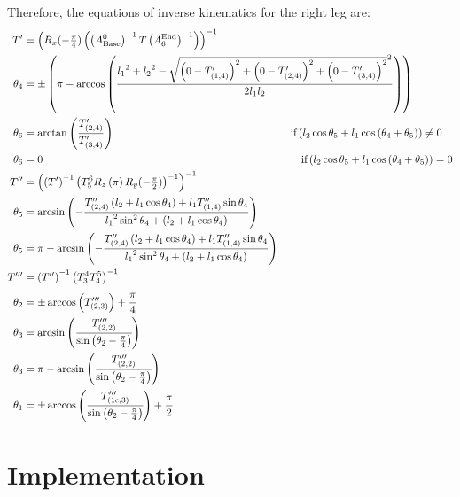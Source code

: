 Therefore, the equations of inverse kinematics for the right leg are:
\begin{align*}%
T' &= \left(R_x(-\tfrac{\pi}{4})\left(\left(A^0_\text{Base}\right)^{-1} T \left(A^\text{End}_6\right)^{-1}\right)\right)^{-1} \\
\theta_4 &=\pm\left(\pi - \arccos\left(\frac{{l_1}^2 + {l_2}^2 - \sqrt{\left(0-T'_{(1,4)}\right)^2 + \left(0-T'_{(2,4)}\right)^2 + \left(0-T'_{(3,4)}\right)^2}^2}{2 l_1 l_2}\right)\right) \\
\theta_6 &= \arctan\left(\frac{T'_{(2,4)}}{T'_{(3,4)}}\right)\hspace{5.78cm}\text{if} \left(l_2\cos\theta_5 + l_1 \cos\left(\theta_4 + \theta_5\right)\right) \neq 0 \\
\theta_6 &= 0 \hspace{8.5cm}\text{if} \left(l_2\cos\theta_5 + l_1 \cos\left(\theta_4 + \theta_5\right)\right) = 0 \\
T'' &= \left(\left(T'\right)^{-1}\left(T^6_5R_z\left(\pi\right)R_y(-\tfrac{\pi}{2})\right)^{-1}\right)^{-1} \\
\theta_5 &= \arcsin\left(-\frac{T''_{(2,4)}\left(l_2+l_1\cos\theta_4\right) + l_1T''_{(1,4)}\sin\theta_4}{{l_1}^2\sin^2\theta_4 + \left(l_2 + l_1\cos\theta_4\right)}\right) \\
\theta_5 &= \pi - \arcsin\left(-\frac{T''_{(2,4)}\left(l_2+l_1\cos\theta_4\right) + l_1T''_{(1,4)}\sin\theta_4}{{l_1}^2\sin^2\theta_4 + \left(l_2 + l_1\cos\theta_4\right)}\right)\\
T''' &= \left(T''\right)^{-1}\left(T^4_3T^5_4\right)^{-1} \\
\theta_2 &= \pm\arccos\left(T'''_{(2,3)}\right) + \cfrac{\pi}{4} \\
\theta_3 &= \arcsin\left(\cfrac{T'''_{(2,2)}}{\sin\left(\theta_2 - \frac{\pi}{4}\right)}\right) \\
\theta_3 &= \pi - \arcsin\left(\cfrac{T'''_{(2,2)}}{\sin\left(\theta_2 - \frac{\pi}{4}\right)}\right) \\
\theta_1 &= \pm\arccos\left(\cfrac{T'''_{(1c,3)}}{\sin\left(\theta_2 - \frac{\pi}{4}\right)}\right) + \cfrac{\pi}{2}
\end{align*}










\section{Implementation}

